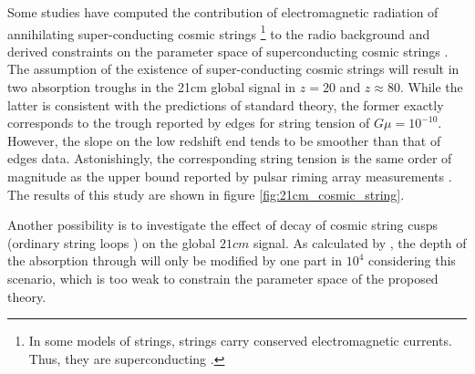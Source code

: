 \documentclass[12pt, TexShade, letterpaper]{report}
\begin{document}
Some studies have computed the contribution of electromagnetic radiation of annihilating super-conducting cosmic strings \footnote{In some models of strings, strings carry conserved electromagnetic currents. Thus, they are superconducting \cite{constrain_superconduct}.}  to the radio background and derived constraints on the parameter space of superconducting cosmic strings \cite{constrain_superconduct, constrain_spectral_bryce, massive_BH}. The assumption of the existence of super-conducting cosmic strings will result in two absorption troughs in the 21cm global signal in $z=20$ and $z\approx 80$. While the latter is consistent with the predictions of standard theory, the former exactly corresponds to the trough reported by \gls{edges} for string tension of $G\mu = 10 ^{-10}$. However, the slope on the low redshift end tends to be smoother than that of \gls{edges} data. Astonishingly, the corresponding string tension is the same order of magnitude as the upper bound reported by pulsar riming array measurements \cite{cosmic_string_jordan_robert, pulsar_timing}. The results of this study are shown in figure \ref{fig:21cm_cosmic_string}.\par
Another possibility is to investigate the effect of decay of cosmic string cusps (ordinary string loops \cite{massive_BH}) on the global $21cm$ signal. As calculated by \cite{robert_cusps}, the depth of the absorption through will only be modified by one part in $10^4$ considering this scenario, which is too weak to constrain the parameter space of the proposed theory.\par

\end{document}
